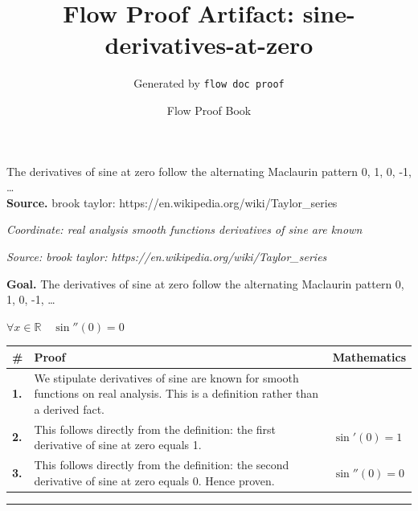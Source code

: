 \documentclass[11pt]{article}
\title{Flow Proof Artifact: sine-derivatives-at-zero}
\author{Generated by \texttt{flow doc proof}}
\date{Flow Proof Book}
\theoremstyle{definition}
\begin{document}
\maketitle
The derivatives of sine at zero follow the alternating Maclaurin pattern 0, 1, 0, -1, …\\[0.5em]
\textbf{Source.} brook taylor: https://en.wikipedia.org/wiki/Taylor\_series\\[0.5em]
\bigskip
{}\par
\smallskip\noindent\textit{Coordinate: real analysis \cdot smooth functions \cdot derivatives of sine are known}\par
\smallskip\noindent\textit{Source: brook taylor: https://en.wikipedia.org/wiki/Taylor\_series}\par
\medskip
\noindent\textbf{Goal.} The derivatives of sine at zero follow the alternating Maclaurin pattern 0, 1, 0, -1, …\par
\noindent$\displaystyle \forall x \in \mathbb{R}\quad \sin''(0) = 0$\par
\medskip
\noindent
\begin{tabular}{@{} >{\raggedright\arraybackslash}p{} >{\raggedright\arraybackslash}p{} >{\raggedleft\arraybackslash}p{} @{}}
\textbf{\#} & \textbf{Proof} & \textbf{Mathematics} \\
\midrule
\textbf{1.} & We stipulate derivatives of sine are known for smooth functions on real analysis. This is a definition rather than a derived fact. & \\[0.45em]
\textbf{2.} & This follows directly from the definition: the first derivative of sine at zero equals 1. & $\displaystyle \sin'(0) = 1$ \\[0.45em]
\textbf{3.} & This follows directly from the definition: the second derivative of sine at zero equals 0. Hence proven. & $\displaystyle \sin''(0) = 0$ \\[0.45em]
\bottomrule
\end{tabular}
\label{thm:Analysis-smooth functions-derivatives_of_sine_are_known}
\par\medskip\hrule
\end{document}
